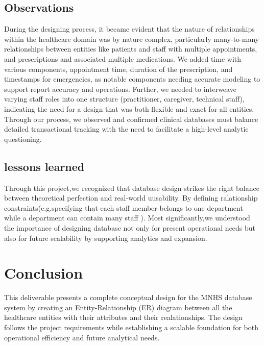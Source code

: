 \documentclass[a4paper,12pt]{article}
\begin{document}
\subsection*{Observations}
During the designing process, it became evident that the nature of relationships within the healthcare domain was by nature complex, particularly many-to-many relationships between entities like patients and staff with multiple appointments, and prescriptions and associated multiple medications. We added time with various components, appointment time, duration of the prescription, and timestamps for emergencies, as notable components needing accurate modeling to support report accuracy and operations. Further, we needed to interweave varying staff roles into one structure (practitioner, caregiver, technical staff), indicating the need for a design that was both flexible and exact for all entities. Through our process, we observed and confirmed clinical databases must balance detailed transactional tracking with the need to facilitate a high-level analytic questioning.

\subsection*{lessons learned}
Through this project,we recognized that database design strikes the right balance between theoretical perfection and real-world uusability.
By defining ralationship constraints(e.g.specifying that each staff member belongs to one department while a department can contain many staff ).
Most significantly,we understood the importance of designing database not only for present operational needs but also for future scalability by supporting analytics and expansion.

\section{Conclusion}
This deliverable presents a complete conceptual design for the MNHS database system by creating an Entity-Relationship (ER) diagram between all the healthcare entities with their attributes and their realationships.
The design follows the project requirements while establishing a scalable foundation for both operational efficiency and future analytical needs.
\end{document}
